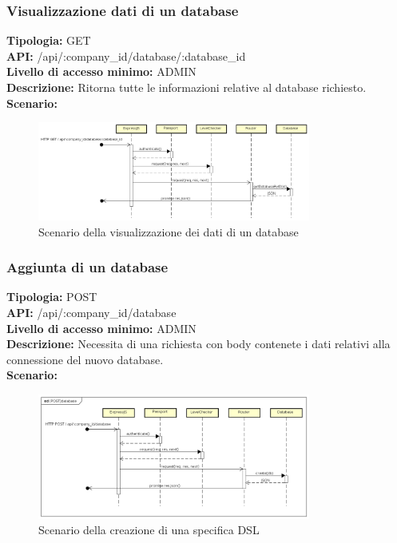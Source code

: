 \newpage
\subsubsection{Visualizzazione dati di un database}
\textbf{Tipologia:} GET \\
\textbf{API:} /api/:company\_id/database/:database\_id \\
\textbf{Livello di accesso minimo:} ADMIN \\
\textbf{Descrizione:} Ritorna tutte le informazioni relative al database richiesto. \\
\textbf{Scenario:} 
\begin{figure}[h]
\centering
\includegraphics[width=0.8\textwidth]{res/sections/backend/(GET)databaseById.png}
\caption{Scenario della visualizzazione dei dati di un database}
\end{figure}

\newpage
\subsubsection{Aggiunta di un database}
\textbf{Tipologia:} POST \\
\textbf{API:} /api/:company\_id/database \\
\textbf{Livello di accesso minimo:} ADMIN \\
\textbf{Descrizione:} Necessita di una richiesta con body contenete i dati relativi alla connessione del nuovo database. \\
\textbf{Scenario:}
\begin{figure}[h]
\centering
\includegraphics[width=0.8\textwidth]{res/sections/backend/(POST)database.png}
\caption{Scenario della creazione di una specifica DSL}
\end{figure}

